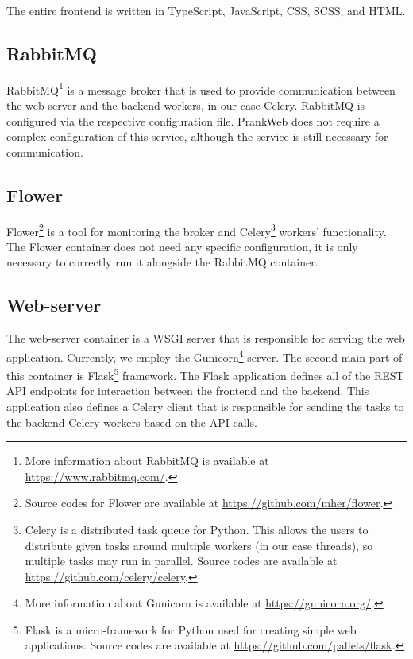 The entire frontend is written in TypeScript, JavaScript, CSS, SCSS, and HTML.

\subsection{RabbitMQ}
\label{subsec:rabbitmq}

RabbitMQ\footnote{More information about RabbitMQ is available at \url{https://www.rabbitmq.com/}.} is a message broker that is used to provide communication between the web server and the backend workers, in our case Celery. RabbitMQ is configured via the respective configuration file. PrankWeb does not require a complex configuration of this service, although the service is still necessary for communication.

\subsection{Flower}
\label{subsec:flower}

Flower\footnote{Source codes for Flower are available at \url{https://github.com/mher/flower}.} is a tool for monitoring the broker and Celery\footnote{Celery is a distributed task queue for Python. This allows the users to distribute given tasks around multiple workers (in our case threads), so multiple tasks may run in parallel. Source codes are available at \url{https://github.com/celery/celery}.} workers' functionality. The Flower container does not need any specific configuration, it is only necessary to correctly run it alongside the RabbitMQ container.

\subsection{Web-server}
\label{subsec:web-server}

The web-server container is a WSGI server that is responsible for serving the web application. Currently, we employ the Gunicorn\footnote{More information about Gunicorn is available at \url{https://gunicorn.org/}.} server. The second main part of this container is Flask\footnote{Flask is a micro-framework for Python used for creating simple web applications. Source codes are available at \url{https://github.com/pallets/flask}.} framework. The Flask application defines all of the REST API endpoints for interaction between the frontend and the backend. This application also defines a Celery client that is responsible for sending the tasks to the backend Celery workers based on the API calls.

